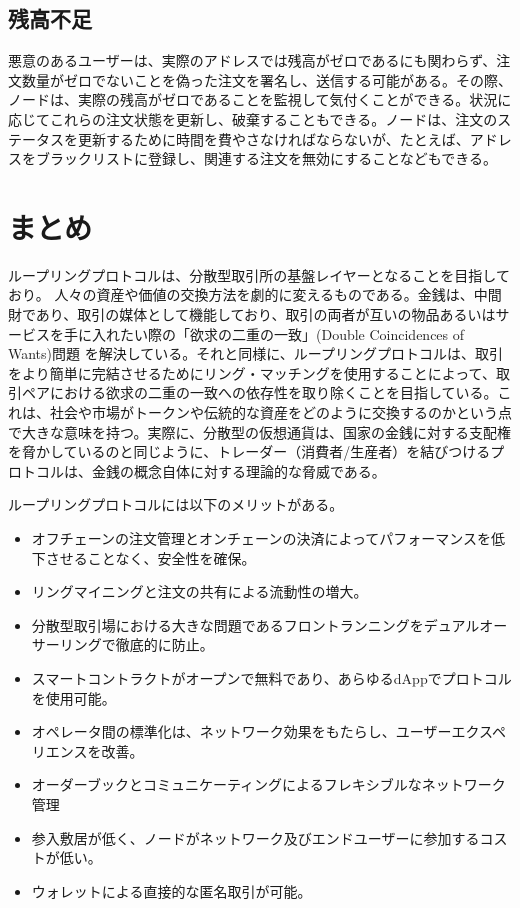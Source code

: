 \documentclass{article}
\begin{document}
\begin{multicols}{2}
\subsection{残高不足}
悪意のあるユーザーは、実際のアドレスでは残高がゼロであるにも関わらず、注文数量がゼロでないことを偽った注文を署名し、送信する可能がある。その際、ノードは、実際の残高がゼロであることを監視して気付くことができる。状況に応じてこれらの注文状態を更新し、破棄することもできる。ノードは、注文のステータスを更新するために時間を費やさなければならないが、たとえば、アドレスをブラックリストに登録し、関連する注文を無効にすることなどもできる。

\section{まとめ}

ループリングプロトコルは、分散型取引所の基盤レイヤーとなることを目指しており。 人々の資産や価値の交換方法を劇的に変えるものである。金銭は、中間財であり、取引の媒体として機能しており、取引の両者が互いの物品あるいはサービスを手に入れたい際の「欲求の二重の一致」(Double Coincidences of Wants)問題 \cite{unenumerated2006}を解決している。それと同様に、ループリングプロトコルは、取引をより簡単に完結させるためにリング・マッチングを使用することによって、取引ペアにおける欲求の二重の一致への依存性を取り除くことを目指している。これは、社会や市場がトークンや伝統的な資産をどのように交換するのかという点で大きな意味を持つ。実際に、分散型の仮想通貨は、国家の金銭に対する支配権を脅かしているのと同じように、トレーダー（消費者/生産者）を結びつけるプロトコルは、金銭の概念自体に対する理論的な脅威である。

ループリングプロトコルには以下のメリットがある。

\begin{itemize}
	\item オフチェーンの注文管理とオンチェーンの決済によってパフォーマンスを低下させることなく、安全性を確保。
	\item リングマイニングと注文の共有による流動性の増大。
	\item 分散型取引場における大きな問題であるフロントランニングをデュアルオーサーリングで徹底的に防止。
	\item スマートコントラクトがオープンで無料であり、あらゆるdAppでプロトコルを使用可能。
	\item オペレータ間の標準化は、ネットワーク効果をもたらし、ユーザーエクスペリエンスを改善。
	\item オーダーブックとコミュニケーティングによるフレキシブルなネットワーク管理
	\item 参入敷居が低く、ノードがネットワーク及びエンドユーザーに参加するコストが低い。
	\item ウォレットによる直接的な匿名取引が可能。
\end{itemize}


\end{multicols}
\end{document}
